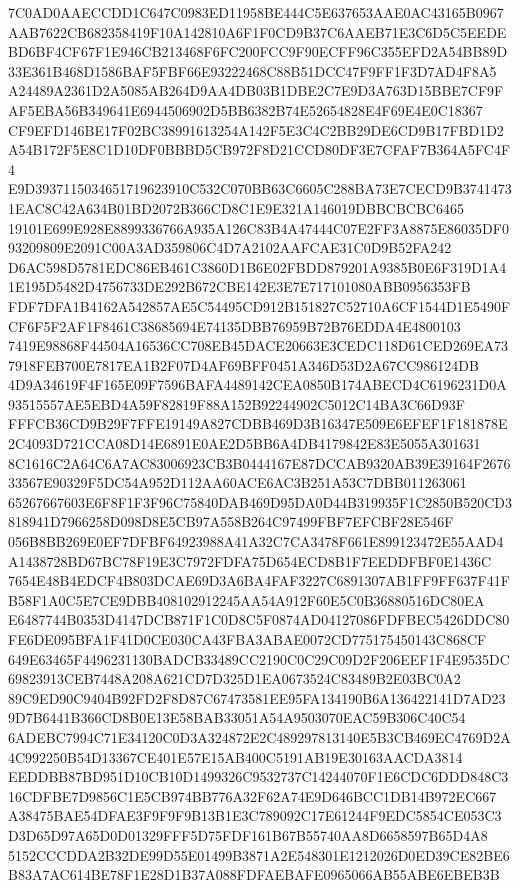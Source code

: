 \documentclass[UTF8,fontset=fandol,zihao=-4,a4paper]{ctexart}
\begin{document}
{{7C0AD0AAECCDD1C647C0983ED11958BE444C5E637653AAE0AC43165B0967AAB7622CB682358419F10A142810A6F1F0CD9B37C6AAEB71E3C6D5C5EEDE
BD6BF4CF67F1E946CB213468F6FC200FCC9F90ECFF96C355EFD2A54BB89D33E361B468D1586BAF5FBF66E93222468C88B51DCC47F9FF1F3D7AD4F8A5
A24489A2361D2A5085AB264D9AA4DB03B1DBE2C7E9D3A763D15BBE7CF9FAF5EBA56B349641E6944506902D5BB6382B74E52654828E4F69E4E0C18367
CF9EFD146BE17F02BC38991613254A142F5E3C4C2BB29DE6CD9B17FBD1D2A54B172F5E8C1D10DF0BBBD5CB972F8D21CCD80DF3E7CFAF7B364A5FC4F4
E9D3937115034651719623910C532C070BB63C6605C288BA73E7CECD9B37414731EAC8C42A634B01BD2072B366CD8C1E9E321A146019DBBCBCBC6465
19101E699E928E8899336766A935A126C83B4A47444C07E2FF3A8875E86035DF093209809E2091C00A3AD359806C4D7A2102AAFCAE31C0D9B52FA242
D6AC598D5781EDC86EB461C3860D1B6E02FBDD879201A9385B0E6F319D1A41E195D5482D4756733DE292B672CBE142E3E7E717101080ABB0956353FB
FDF7DFA1B4162A542857AE5C54495CD912B151827C52710A6CF1544D1E5490FCF6F5F2AF1F8461C38685694E74135DBB76959B72B76EDDA4E4800103
7419E98868F44504A16536CC708EB45DACE20663E3CEDC118D61CED269EA737918FEB700E7817EA1B2F07D4AF69BFF0451A346D53D2A67CC986124DB
4D9A34619F4F165E09F7596BAFA4489142CEA0850B174ABECD4C6196231D0A93515557AE5EBD4A59F82819F88A152B92244902C5012C14BA3C66D93F
FFFCB36CD9B29F7FFE19149A827CDBB469D3B16347E509E6EFEF1F181878E2C4093D721CCA08D14E6891E0AE2D5BB6A4DB4179842E83E5055A301631
8C1616C2A64C6A7AC83006923CB3B0444167E87DCCAB9320AB39E39164F267633567E90329F5DC54A952D112AA60ACE6AC3B251A53C7DBB011263061
65267667603E6F8F1F3F96C75840DAB469D95DA0D44B319935F1C2850B520CD3818941D7966258D098D8E5CB97A558B264C97499FBF7EFCBF28E546F
056B8BB269E0EF7DFBF64923988A41A32C7CA3478F661E899123472E55AAD4A1438728BD67BC78F19E3C7972FDFA75D654ECD8B1F7EEDDFBF0E1436C
7654E48B4EDCF4B803DCAE69D3A6BA4FAF3227C6891307AB1FF9FF637F41FB58F1A0C5E7CE9DBB408102912245AA54A912F60E5C0B36880516DC80EA
E6487744B0353D4147DCB871F1C0D8C5F0874AD04127086FDFBEC5426DDC80FE6DE095BFA1F41D0CE030CA43FBA3ABAE0072CD775175450143C868CF
649E63465F4496231130BADCB33489CC2190C0C29C09D2F206EEF1F4E9535DC69823913CEB7448A208A621CD7D325D1EA0673524C83489B2E03BC0A2
89C9ED90C9404B92FD2F8D87C67473581EE95FA134190B6A136422141D7AD239D7B6441B366CD8B0E13E58BAB33051A54A9503070EAC59B306C40C54
6ADEBC7994C71E34120C0D3A324872E2C489297813140E5B3CB469EC4769D2A4C992250B54D13367CE401E57E15AB400C5191AB19E30163AACDA3814
EEDDBB87BD951D10CB10D1499326C9532737C14244070F1E6CDC6DDD848C316CDFBE7D9856C1E5CB974BB776A32F62A74E9D646BCC1DB14B972EC667
A38475BAE54DFAE3F9F9F9B13B1E3C789092C17E61244F9EDC5854CE053C3D3D65D97A65D0D01329FFF5D75FDF161B67B55740AA8D6658597B65D4A8
5152CCCDDA2B32DE99D55E01499B3871A2E548301E1212026D0ED39CE82BE6B83A7AC614BE78F1E28D1B37A088FDFAEBAFE0965066AB55ABE6EBEB3B
}}
\end{document}

